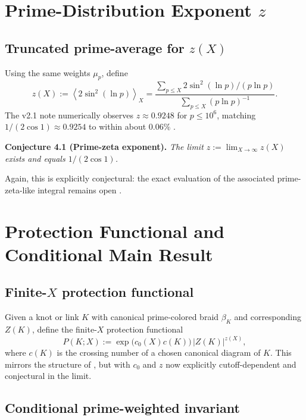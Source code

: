 \documentclass[11pt]{article}
\begin{document}
\section{Prime-Distribution Exponent $z$}

\subsection{Truncated prime-average for $z(X)$}

Using the same weights $\mu_p$, define
\begin{equation}
  z(X) := \left\langle 2\sin^2(\ln p) \right\rangle_X
   = \frac{\sum_{p\le X} 2\sin^2(\ln p)/(p\ln p)}{\sum_{p\le X} (p\ln p)^{-1}}.
  \label{eq:zX}
\end{equation}
The v2.1 note numerically observes $z \approx 0.9248$ for $p\le 10^6$, matching $1/(2\cos 1) \approx 0.9254$ to within about $0.06\%$ \cite[Sec.~4]{MTv21}.

\medskip

\noindent\textbf{Conjecture 4.1 (Prime-zeta exponent).}
\emph{The limit $z := \lim_{X\to\infty} z(X)$ exists and equals $1/(2\cos 1)$.}

Again, this is explicitly conjectural: the exact evaluation of the associated prime-zeta-like integral remains open \cite[Remark~4.1]{MTv21}.

\section{Protection Functional and Conditional Main Result}

\subsection{Finite-$X$ protection functional}

Given a knot or link $K$ with canonical prime-colored braid $\beta_K$ and corresponding $Z(K)$, define the finite-$X$ protection functional
\begin{equation}
  P(K;X) := \exp\big(c_0(X) c(K)\big)\, |Z(K)|^{z(X)},
  \label{eq:PKX}
\end{equation}
where $c(K)$ is the crossing number of a chosen canonical diagram of $K$. This mirrors the structure of \cite[Eq.~(7)]{MTv21}, but with $c_0$ and $z$ now explicitly cutoff-dependent and conjectural in the limit.

\subsection{Conditional prime-weighted invariant}
\end{document}
